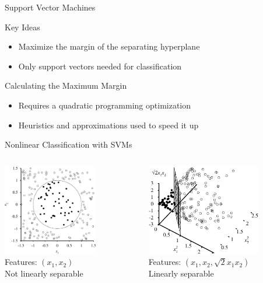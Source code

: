 \documentclass[12pt]{beamer}
\begin{document}
\begin{frame}{Support Vector Machines}
	\begin{block}{Key Ideas}
		\begin{itemize}
			\item Maximize the margin of the separating hyperplane
			\item Only support vectors needed for classification
		\end{itemize}
	\end{block}
	\begin{block}{Calculating the Maximum Margin}
		\begin{itemize}
			\item Requires a quadratic programming optimization
			\item Heuristics and approximations used to speed it up
		\end{itemize}
	\end{block}
\end{frame}
\begin{frame}{Nonlinear Classification with SVMs}
	\begin{columns}
		\begin{column}{2in}
			\includegraphics[height=1.55in]{svm-kernel-1}
			\\ \bigskip
			\centering
			Features: $(x_1, x_2)$ \\
			\alert{Not linearly separable}
		\end{column}
		\pause
		\begin{column}{2in}
			\includegraphics[height=1.55in]{svm-kernel-2}
			\\ \bigskip
			\centering
			Features: $(x_1, x_2, \sqrt{2} x_1 x_2)$ \\
			\alert{Linearly separable}
		\end{column}
	\end{columns}
\end{frame}
\end{document}
